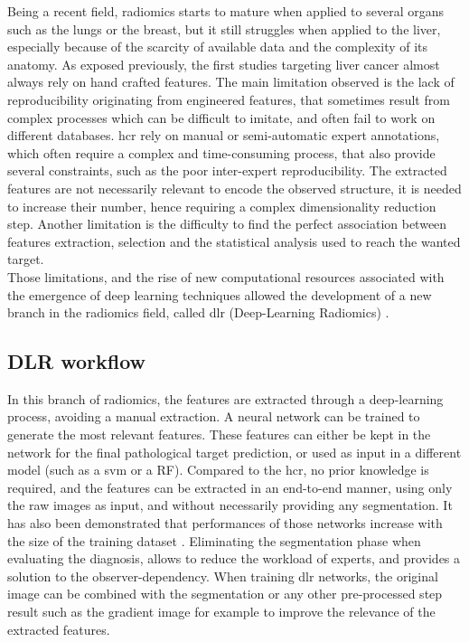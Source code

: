 Being a recent field, radiomics starts to mature when applied to several
organs such as the lungs or the breast, but it still struggles when
applied to the liver, especially because of the scarcity of available
data and the complexity of its anatomy.
As exposed previously, the first studies targeting liver cancer almost
always rely on hand crafted features.
The main limitation observed is the lack of reproducibility originating
from engineered features, that sometimes result from complex processes
which can be difficult to imitate, and often fail to work on different
databases. \ac{hcr} rely on manual or semi-automatic expert annotations, which
often require a complex and time-consuming process, that also provide
several constraints, such as the poor inter-expert reproducibility.
The extracted features are not necessarily relevant to encode the
observed structure, it is needed to increase their number, hence
requiring a complex dimensionality reduction step.
Another limitation is the difficulty to find the perfect association
between features extraction, selection and the statistical analysis used
to reach the wanted target.\\
Those limitations, and the rise of new computational resources
associated with the emergence of deep learning techniques allowed the
development of a new branch in the radiomics field, called \ac{dlr}
(Deep-Learning Radiomics) \cite{Afshar2018}.

\subsection{DLR workflow}\label{dlr-workflow}

In this branch of radiomics, the features are extracted through a
deep-learning process, avoiding a manual extraction.
A neural network can be trained to generate the most relevant features.
These features can either be kept in the network for the final
pathological target prediction, or used as input in a different model
(such as a \ac{svm} or a RF).
Compared to the \ac{hcr}, no prior knowledge is required, and the
features can be extracted in an end-to-end manner, using only the raw
images as input, and without necessarily providing any segmentation. It
has also been demonstrated that performances of those networks increase
with the size of the training dataset \cite{Cheng2016}.
Eliminating the segmentation phase when evaluating the diagnosis, allows
to reduce the workload of experts, and provides a solution to the
observer-dependency.
When training \ac{dlr} networks, the original image can be combined
with the segmentation or any other pre-processed step result such as the
gradient image for example \cite{Sun2017a} to improve
the relevance of the extracted features.

